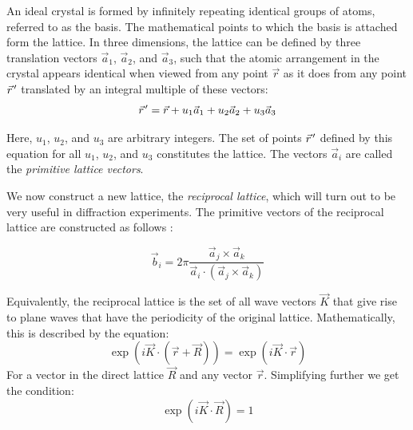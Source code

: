 \documentclass{article}
\newcommand{\pvec}[1]{\vec{#1}\mkern2mu\vphantom{#1}}
\begin{document}
An ideal crystal is formed by infinitely repeating identical groups of atoms, referred to as the basis. The mathematical points to which the basis is attached form the lattice. In three dimensions, the lattice can be defined by three translation vectors $\vec{a}_1$, $\vec{a}_2$, and $\vec{a}_3$, such that the atomic arrangement in the crystal appears identical when viewed from any point $\vec{r}$ as it does from any point $\pvec{r}'$ translated by an integral multiple of these vectors:
\begin{equation}
    \pvec{r}' = \vec{r} + u_1 \vec{a}_1 + u_2 \vec{a}_2 + u_3 \vec{a}_3
\end{equation}


Here, $u_1$, $u_2$, and $u_3$ are arbitrary integers. The set of points $\pvec{r}'$ defined by this equation for all $u_1$, $u_2$, and $u_3$ constitutes the lattice. The vectors $\vec{a}_i$ are called the \textit{primitive lattice vectors}. 

We now construct a new lattice, the \textit{reciprocal lattice}, which will turn out to be very useful in diffraction experiments. The primitive vectors of the reciprocal lattice are constructed as follows \cite{kittel_1955_solid}: 

\begin{equation}
\vec{b}_i=2 \pi \frac{\vec{a}_j \times \vec{a}_k}{\vec{a}_i \cdot\left(\vec{a}_j \times \vec{a}_k\right)}
\end{equation}

Equivalently, the reciprocal lattice is the set of all wave vectors $\vec{K}$ that give rise to plane waves that have the periodicity of the original lattice. Mathematically, this is described by the equation: 
\begin{equation}
    \exp(i\vec{K} \cdot (\vec{r}+\vec{R})) = \exp(i\vec{K} \cdot \vec{r})
\end{equation}
For a vector in the direct lattice $\vec{R}$ and any vector $\vec{r}$.
Simplifying further we get the condition:  
\begin{equation}
    \exp(i\vec{K} \cdot \vec{R}) = 1
\end{equation}
\end{document}

